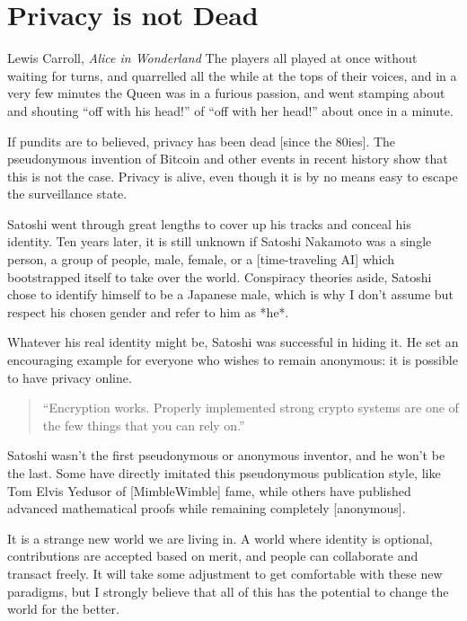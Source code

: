 \chapter{ Privacy is not Dead}
\label{les:19}

\begin{chapquote}{Lewis Carroll, \textit{Alice in Wonderland}}
The players all played at once without waiting for turns, and quarrelled all
the while at the tops of their voices, and in a very few minutes the Queen was
in a furious passion, and went stamping about and shouting ``off with his
head!'' of ``off with her head!'' about once in a minute.
\end{chapquote}

If pundits are to believed, privacy has been dead [since the 80ies]. The
pseudonymous invention of Bitcoin and other events in recent history
show that this is not the case. Privacy is alive, even though it is by
no means easy to escape the surveillance state.

Satoshi went through great lengths to cover up his tracks and conceal
his identity. Ten years later, it is still unknown if Satoshi Nakamoto
was a single person, a group of people, male, female, or a
[time-traveling AI] which bootstrapped itself to take over the world.
Conspiracy theories aside, Satoshi chose to identify himself to be a
Japanese male, which is why I don't assume but respect his chosen gender
and refer to him as *he*.


Whatever his real identity might be, Satoshi was successful in hiding
it. He set an encouraging example for everyone who wishes to remain
anonymous: it is possible to have privacy online.

\begin{quotation}
``Encryption works. Properly implemented strong crypto systems are one
of the few things that you can rely on.''
\end{quotation}

Satoshi wasn't the first pseudonymous or anonymous inventor, and he
won't be the last. Some have directly imitated this pseudonymous
publication style, like Tom Elvis Yedusor of [MimbleWimble] fame, while
others have published advanced mathematical proofs while remaining
completely [anonymous].

It is a strange new world we are living in. A world where identity is
optional, contributions are accepted based on merit, and people can
collaborate and transact freely. It will take some adjustment to get
comfortable with these new paradigms, but I strongly believe that all of
this has the potential to change the world for the better.

